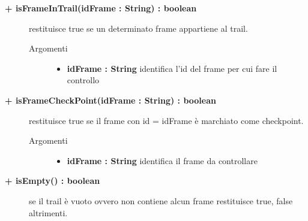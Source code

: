 \begin{description}
\begin{description}
	\end{description}
	
	\begin{description}
		\item[\textbf{\color{blue}+ isFrameInTrail(idFrame : String) : boolean			}] \hfill
			restituisce true se un determinato frame appartiene al trail.
			
		\begin{description}
			\item[Argomenti] \hfill
				\begin{itemize}
				
					\item \textbf{idFrame : String			} \hfill
						identifica l'id del frame per cui fare il controllo
					
				\end{itemize}
		\end{description}
	\end{description}
	
	\begin{description}
		\item[\textbf{\color{blue}+ isFrameCheckPoint(idFrame : String) : boolean			}] \hfill
			restituisce true se il frame con id = idFrame è marchiato come checkpoint.
			
		\begin{description}
			\item[Argomenti] \hfill
				\begin{itemize}
				
					\item \textbf{idFrame : String			} \hfill
						identifica il frame da controllare
					
				\end{itemize}
		\end{description}
	\end{description}
	
	\begin{description}
		\item[\textbf{\color{blue}+ isEmpty() : boolean			}] \hfill
			se il trail è vuoto ovvero non contiene alcun frame restituisce true, false altrimenti.
			
	\end{description}
	

\end{description}
